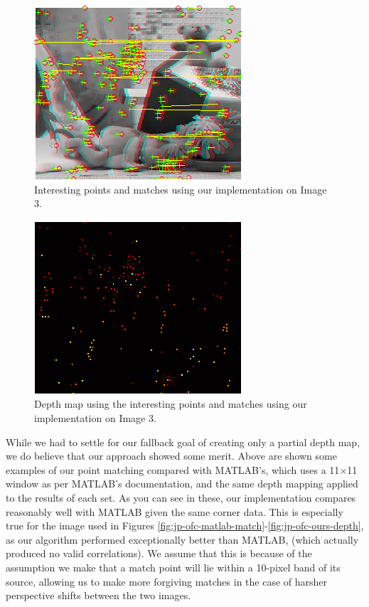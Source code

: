 \begin{figure}[H]\centering
	\includegraphics[width=0.8\linewidth]{Images/03_our_match.png}
	\caption{Interesting points and matches using our implementation on Image 3.}
	\label{fig:bear-ours-match}
\end{figure}

\begin{figure}[H]\centering
	\includegraphics[width=0.8\linewidth]{Images/03_our_depth.png}
	\caption{Depth map using the interesting points and matches using our implementation on Image 3.}
	\label{fig:bear-ours-depth}
\end{figure}

While we had to settle for our fallback goal of creating only a partial depth map, we do believe that our approach showed some merit. Above are shown some examples of our point matching compared with MATLAB's, which uses a 11$\times$11 window as per MATLAB's documentation, and the same depth mapping applied to the results of each set. As you can see in these, our implementation compares reasonably well with MATLAB given the same corner data. This is especially true for the image used in Figures \ref{fig:jp-ofc-matlab-match}-\ref{fig:jp-ofc-ours-depth}, as our algorithm performed exceptionally better than MATLAB, (which actually produced no valid correlations). We assume that this is because of the assumption we make that a match point will lie within a 10-pixel band of its source, allowing us to make more forgiving matches in the case of harsher perspective shifts between the two images.

